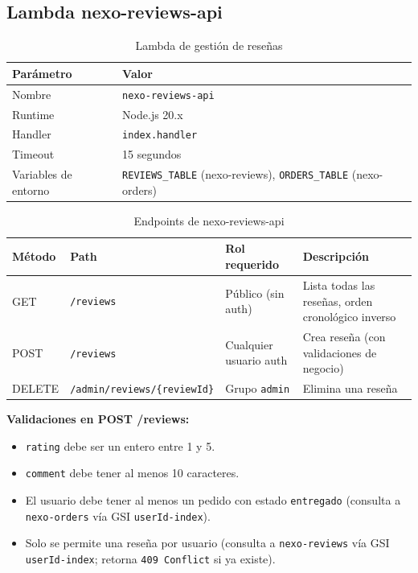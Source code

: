 \documentclass[12pt,a4paper]{article}
\begin{document}
\subsection{Lambda nexo-reviews-api}

\begin{table}[H]
\centering
\begin{tabular}{@{}ll@{}}
\toprule
\textbf{Parámetro} & \textbf{Valor} \\
\midrule
Nombre & \texttt{nexo-reviews-api} \\
Runtime & Node.js 20.x \\
Handler & \texttt{index.handler} \\
Timeout & 15 segundos \\
Variables de entorno & \texttt{REVIEWS\_TABLE} (nexo-reviews), \texttt{ORDERS\_TABLE} (nexo-orders) \\
\bottomrule
\end{tabular}
\caption{Lambda de gestión de reseñas}
\end{table}

\begin{table}[H]
\centering
\begin{tabular}{@{}llll@{}}
\toprule
\textbf{Método} & \textbf{Path} & \textbf{Rol requerido} & \textbf{Descripción} \\
\midrule
GET    & \texttt{/reviews} & Público (sin auth) & Lista todas las reseñas, orden cronológico inverso \\
POST   & \texttt{/reviews} & Cualquier usuario auth & Crea reseña (con validaciones de negocio) \\
DELETE & \texttt{/admin/reviews/\{reviewId\}} & Grupo \texttt{admin} & Elimina una reseña \\
\bottomrule
\end{tabular}
\caption{Endpoints de nexo-reviews-api}
\end{table}

\begin{nexobox}
\textbf{Validaciones en POST /reviews:}
\begin{itemize}
  \item \texttt{rating} debe ser un entero entre 1 y 5.
  \item \texttt{comment} debe tener al menos 10 caracteres.
  \item El usuario debe tener al menos un pedido con estado \texttt{entregado}
    (consulta a \texttt{nexo-orders} vía GSI \texttt{userId-index}).
  \item Solo se permite una reseña por usuario (consulta a \texttt{nexo-reviews}
    vía GSI \texttt{userId-index}; retorna \texttt{409 Conflict} si ya existe).
\end{itemize}
\end{nexobox}
\end{document}
